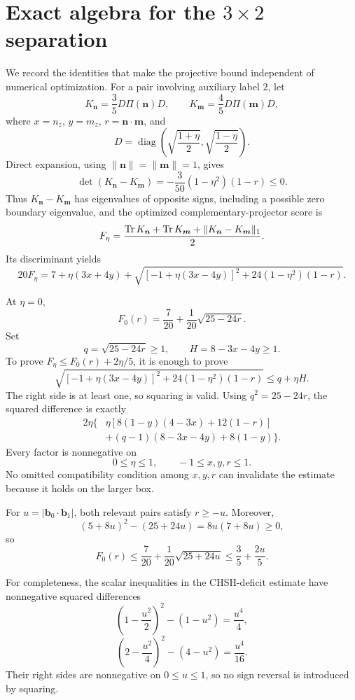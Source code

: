 \section[Exact algebra for the 3-by-2 separation]
{Exact algebra for the \(3\times2\) separation}
\label{app:separation-algebra}

We record the identities that make the projective bound independent of
numerical optimization. For a pair involving auxiliary label \(2\), let
\[
K_{\bm n}=\frac35D \Pi(\bm n)D,\qquad
K_{\bm m}=\frac45D \Pi(\bm m)D,
\]
where \(x=n_z\), \(y=m_z\), \(r=\bm n\cdot\bm m\), and
\[
D=\operatorname{diag}\!\left(
\sqrt{\frac{1+\eta}{2}},\sqrt{\frac{1-\eta}{2}}\right).
\]
Direct expansion, using \(\|\bm n\|=\|\bm m\|=1\), gives
\[
\det(K_{\bm n}-K_{\bm m})
=-\frac3{50}(1-\eta^2)(1-r)\le0.
\]
Thus \(K_{\bm n}-K_{\bm m}\) has eigenvalues of opposite signs, including a
possible zero boundary eigenvalue, and the optimized complementary-projector
score is
\[
F_\eta=
\frac{\operatorname{Tr} K_{\bm n}+\operatorname{Tr} K_{\bm m}
      +\|K_{\bm n}-K_{\bm m}\|_1}{2}.
\]
Its discriminant yields
\[
20F_\eta=
7+\eta(3x+4y)+
\sqrt{[-1+\eta(3x-4y)]^2+24(1-\eta^2)(1-r)}.
\]

At \(\eta=0\),
\[
F_0(r)=\frac7{20}+\frac1{20}\sqrt{25-24r}.
\]
Set
\[
q=\sqrt{25-24r}\ge1,\qquad H=8-3x-4y\ge1.
\]
To prove \(F_\eta\le F_0(r)+2\eta/5\), it is enough to prove
\[
\sqrt{[-1+\eta(3x-4y)]^2+24(1-\eta^2)(1-r)}
\le q+\eta H.
\]
The right side is at least one, so squaring is valid. Using
\(q^2=25-24r\), the squared difference is exactly
\[
\begin{aligned}
2\eta\{&
\eta[8(1-y)(4-3x)+12(1-r)]\\
&+(q-1)(8-3x-4y)+8(1-y)\}.
\end{aligned}
\]
Every factor is nonnegative on
\[
0\le\eta\le1,\qquad -1\le x,y,r\le1.
\]
No omitted compatibility condition among \(x,y,r\) can invalidate the
estimate because it holds on the larger box.

For \(u=|\bm b_0\cdot\bm b_1|\), both relevant pairs satisfy \(r\ge-u\).
Moreover,
\[
(5+8u)^2-(25+24u)=8u(7+8u)\ge0,
\]
so
\[
F_0(r)\le\frac7{20}+\frac1{20}\sqrt{25+24u}
\le\frac35+\frac{2u}{5}.
\]

For completeness, the scalar inequalities in the CHSH-deficit estimate have
nonnegative squared differences
\[
\left(1-\frac{u^2}{2}\right)^2-(1-u^2)=\frac{u^4}{4},
\]
\[
\left(2-\frac{u^2}{4}\right)^2-(4-u^2)=\frac{u^4}{16}.
\]
Their right sides are nonnegative on \(0\le u\le1\), so no sign reversal is
introduced by squaring.

